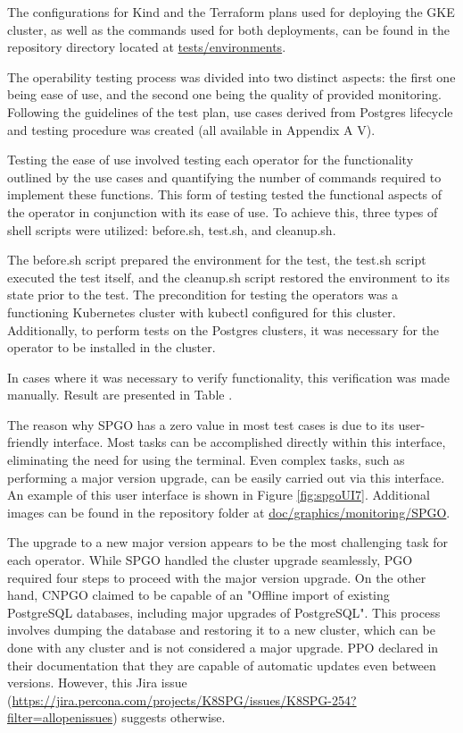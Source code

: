 The configurations for Kind and the Terraform plans used for deploying the GKE cluster, as well as the commands used for both deployments, can be found in the repository directory located at \url{tests/environments}.

\label{chap:operability}

The operability testing process was divided into two distinct aspects: the first one
being ease of use, and the second one being the quality of provided monitoring.
Following the guidelines of the test plan, use cases derived from Postgres lifecycle and testing procedure was created (all available in Appendix A V).

\label{chap:easeOfUse}
Testing the ease of use involved testing each operator for the functionality outlined by the use cases and quantifying the number of commands required to implement these functions.
This form of testing tested the functional aspects of the operator in conjunction with its ease of use.
To achieve this, three types of shell scripts were utilized: before.sh, test.sh, and cleanup.sh.

The before.sh script prepared the environment for the test, the test.sh script executed the test itself, and the cleanup.sh script restored the environment to its state prior to the test.
The precondition for testing the operators was a functioning Kubernetes cluster with kubectl configured for this cluster.
Additionally, to perform tests on the Postgres clusters, it was necessary for the operator to be installed in the cluster.

In cases where it was necessary to verify functionality, this verification was made manually. Result are presented in Table .

The reason why SPGO has a zero value in most test cases is due to its user-friendly interface.
Most tasks can be accomplished directly within this interface, eliminating the need for using the terminal.
Even complex tasks, such as performing a major version upgrade, can be easily carried out via this interface.
An example of this user interface is shown in Figure \ref{fig:spgoUI7}.
Additional images can be found in the repository folder at \url{doc/graphics/monitoring/SPGO}.


The upgrade to a new major version appears to be the most challenging task for each operator. While SPGO handled the cluster upgrade seamlessly, PGO required four steps to proceed with the major version upgrade. On the other hand, CNPGO claimed to be capable of an "Offline import of existing PostgreSQL databases, including major upgrades of PostgreSQL". This process involves dumping the database and restoring it to a new cluster, which can be done with any cluster and is not considered a major upgrade. PPO declared in their documentation that they are capable of automatic updates even between versions. However, this Jira issue (\url{https://jira.percona.com/projects/K8SPG/issues/K8SPG-254?filter=allopenissues}) suggests otherwise.

